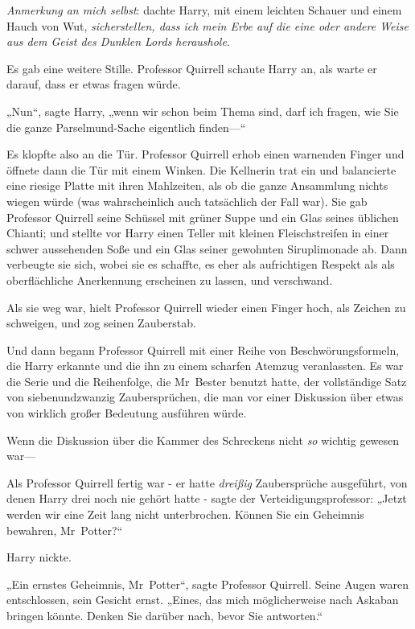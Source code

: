 {\emph{Anmerkung an mich selbst}: dachte Harry, mit einem leichten Schauer und einem Hauch von Wut, \emph{sicherstellen, dass ich mein Erbe auf die eine oder andere Weise aus dem Geist des Dunklen Lords heraushole}.

Es gab eine weitere Stille. Professor Quirrell schaute Harry an, als warte er darauf, dass er etwas fragen würde.

„Nun“, sagte Harry, „wenn wir schon beim Thema sind, darf ich fragen, wie Sie die ganze Parselmund-Sache eigentlich finden—“

Es klopfte also an die Tür. Professor Quirrell erhob einen warnenden Finger und öffnete dann die Tür mit einem Winken. Die Kellnerin trat ein und balancierte eine riesige Platte mit ihren Mahlzeiten, als ob die ganze Ansammlung nichts wiegen würde (was wahrscheinlich auch tatsächlich der Fall war). Sie gab Professor Quirrell seine Schüssel mit grüner Suppe und ein Glas seines üblichen Chianti; und stellte vor Harry einen Teller mit kleinen Fleischstreifen in einer schwer aussehenden Soße und ein Glas seiner gewohnten Siruplimonade ab. Dann verbeugte sie sich, wobei sie es schaffte, es eher als aufrichtigen Respekt als als oberflächliche Anerkennung erscheinen zu lassen, und verschwand.

Als sie weg war, hielt Professor Quirrell wieder einen Finger hoch, als Zeichen zu schweigen, und zog seinen Zauberstab.

Und dann begann Professor Quirrell mit einer Reihe von Beschwörungsformeln, die Harry erkannte und die ihn zu einem scharfen Atemzug veranlassten. Es war die Serie und die Reihenfolge, die Mr~Bester benutzt hatte, der vollständige Satz von siebenundzwanzig Zaubersprüchen, die man vor einer Diskussion über etwas von wirklich großer Bedeutung ausführen würde.

Wenn die Diskussion über die Kammer des Schreckens nicht \emph{so} wichtig gewesen war—

Als Professor Quirrell fertig war - er hatte \emph{dreißig} Zaubersprüche ausgeführt, von denen Harry drei noch nie gehört hatte - sagte der Verteidigungsprofessor: „Jetzt werden wir eine Zeit lang nicht unterbrochen. Können Sie ein Geheimnis bewahren, Mr~Potter?“

Harry nickte.

„Ein ernstes Geheimnis, Mr~Potter“, sagte Professor Quirrell. Seine Augen waren entschlossen, sein Gesicht ernst. „Eines, das mich möglicherweise nach Askaban bringen könnte. Denken Sie darüber nach, bevor Sie antworten.“

}
